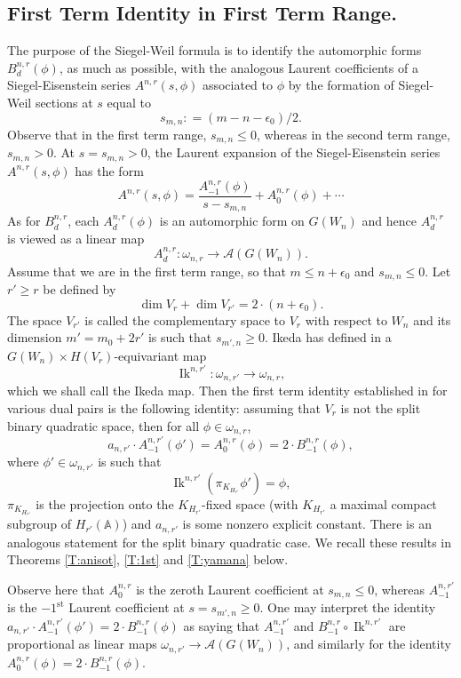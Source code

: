 \documentclass[10pt]{amsart}
\theoremstyle{plain}
\numberwithin{equation}{section}
\begin{document}
\subsection{\bf First Term Identity in First Term Range.}
The purpose of the Siegel-Weil formula is to identify the automorphic forms $B_d^{n,r}(\phi)$, as much as
possible, with the analogous Laurent coefficients of a
Siegel-Eisenstein series $A^{n,r}(s, \phi)$ associated to $\phi$ by
the formation of Siegel-Weil sections at $s$ equal to
\[
s_{m,n}: = (m - n -\epsilon_0)/2.
\]
Observe that in the first term range, $s_{m,n} \leq 0$, whereas in the second term range,
$s_{m,n} > 0$.   At  $s=s_{m,n} >0$, the Laurent expansion of the Siegel-Eisenstein series 
$A^{n,r}(s,\phi)$ has the form
\[  
A^{n,r}(s,\phi) = \frac{A^{n,r}_{-1}(\phi)}{s-s_{m,n}} + A^{n,r}_0(\phi)
+\cdots
\]
As for $B_d^{n,r}$, each
$A_d^{n,r}(\phi)$ is an automorphic form on $G(W_n)$ and hence
$A_d^{n,r}$ is viewed as a linear map
\[
A_d^{n,r}:\omega_{n,r}\rightarrow{\mathcal{A}}(G(W_n)).
\]
Assume that we are in the first
term range, so that $m \leq n+ \epsilon_0$ and $s_{m,n} \leq 0$.
Let $r' \geq r$ be defined by 
\[ \dim V_r + \dim V_{r'}  = 2 \cdot (n+ \epsilon_0).\]
 The space $V_{r'}$ is called the complementary space to $V_r$ with
 respect to $W_n$ and its dimension $m' = m_0 +2r'$ is such that $s_{m',n} \geq 0$.
 Ikeda  has defined in \cite{Ik} a $G(W_n) \times
 H(V_r)$-equivariant map 
\[  
{\operatorname{Ik}}^{n, r'} : \omega_{n,r'} \longrightarrow \omega_{n,r}, 
\]
which we shall call  the Ikeda map. 
Then the  first term identity  established in \cite{KR5, Mo, JS, I2,
  GT, Y2} for various dual pairs is the following identity: assuming that $V_r$ is not the split binary quadratic space, then for all $\phi \in \omega_{n,r}$, 
 \[  
a_{n,r'} \cdot A^{n, r'}_{-1} (\phi') = A^{n,r}_0 (\phi)   = 2 \cdot  B^{n,r}_{-1}(\phi),  
\]
 where $\phi' \in \omega_{n,r'}$ is such that 
 \[  {\operatorname{Ik}}^{n,r'}(\pi_{K_{H_{r'}}}\phi') =
 \phi, \]  
 $\pi_{K_{H_{r'}}}$ is the projection onto the $K_{H_{r'}}$-fixed
 space (with $K_{H_{r'}}$ a maximal compact subgroup of $H_{r'}({\mathbb{A}})$)
 and   $a_{n,r'}$ is some nonzero explicit constant. There is an
 analogous statement for the split binary quadratic case. We recall
 these results in Theorems \ref{T:anisot}, \ref{T:1st} and
 \ref{T:yamana} below.
  \vskip 5pt
 
 Observe here that $A^{n,r}_0$ is the zeroth Laurent coefficient at
 $s_{m,n} \leq 0$, whereas $A^{n,r'}_{-1}$ is the $-1^{\text{st}}$ Laurent
 coefficient at $s= s_{m', n} \geq 0$. One may interpret the identity
 $a_{n,r'} \cdot A^{n, r'}_{-1} (\phi') = 2  \cdot  B^{n,r}_{-1}(\phi)$ as saying that $A_{-1}^{n,r'}$ and
 $B_{-1}^{n,r}\circ{\operatorname{Ik}}^{n,r'}$ are proportional as linear maps
 $\omega_{n, r'}\rightarrow{\mathcal{A}}(G(W_n))$, and similarly for the
 identity $A^{n,r}_0 (\phi)   = 2 \cdot  B^{n,r}_{-1}(\phi)$.
 \vskip 5pt
 
\end{document}
